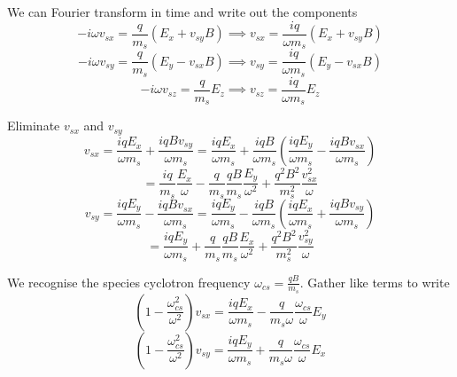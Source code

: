 We can Fourier transform in time and write out the components
\begin{equation}
	-i \omega v_{sx} = \frac{q}{m_s} \left(E_x + v_{sy} B \right) \implies v_{sx} = \frac{iq}{\omega m_s} \left(E_x + v_{sy} B \right)
\end{equation}
\begin{equation}
	-i \omega v_{sy} = \frac{q}{m_s} \left(E_y - v_{sx} B \right) \implies v_{sy} = \frac{iq}{\omega m_s} \left(E_y - v_{sx} B \right)
\end{equation}
\begin{equation}
	-i \omega v_{sz} = \frac{q}{m_s} E_z \implies v_{sz} = \frac{iq}{\omega m_s} E_z
\end{equation}

Eliminate $v_{sx}$ and $v_{sy}$
\begin{equation}
	v_{sx} = \frac{iqE_x}{\omega m_s} + \frac{iqBv_{sy}}{\omega m_s} = \frac{iqE_x}{\omega m_s} + \frac{iqB}{\omega m_s}\left( \frac{iqE_y}{\omega m_s} - \frac{iqB v_{sx}}{\omega m_s} \right)
\end{equation}
\begin{equation}
	= \frac{iq}{m_s}\frac{E_x}{\omega} - \frac{q}{m_s} \frac{qB}{m_s} \frac{E_y}{\omega^2} + \frac{q^2 B^2}{m_s^2} \frac{v_{sx}^2}{\omega}
\end{equation}
\begin{equation}
	v_{sy} = \frac{iqE_y}{\omega m_s} - \frac{iqB v_{sx}}{\omega m_s} = \frac{iqE_y}{\omega m_s} - \frac{iqB}{\omega m_s}\left( \frac{iqE_x}{\omega m_s} + \frac{iqBv_{sy}}{\omega m_s} \right)
\end{equation}
\begin{equation}
	= \frac{iqE_y}{\omega m_s} + \frac{q}{m_s} \frac{qB}{m_s} \frac{E_x}{\omega^2} + \frac{q^2 B^2}{m_s^2} \frac{v_{sy}^2}{\omega}
\end{equation}

We recognise the species cyclotron frequency $\omega_{cs}=\frac{qB}{m_s}$. Gather like terms to write
\begin{equation}
	\left( 1 - \frac{\omega_{cs}^2}{\omega^2} \right)v_{sx} = \frac{iqE_x}{\omega m_s} - \frac{q}{m_s \omega} \frac{\omega_{cs}}{\omega} E_y
\end{equation}
\begin{equation}
	\left( 1 - \frac{\omega_{cs}^2}{\omega^2} \right)v_{sy} = \frac{iqE_y}{\omega m_s} + \frac{q}{m_s \omega} \frac{\omega_{cs}}{\omega} E_x
\end{equation}

